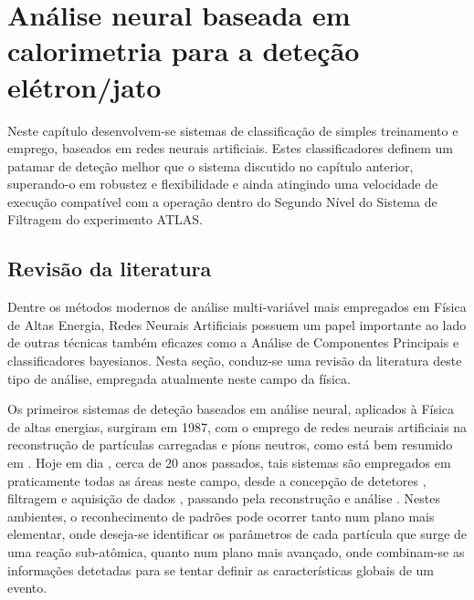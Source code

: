 \typeout{ ====================================================================}
\typeout{ ====================================================================}

\chapter{Análise neural baseada em calorimetria para a deteção
elétron/jato} 
\label{chap:neural}

Neste capítulo desenvolvem-se sistemas de classificação de simples treinamento
e emprego, baseados em redes neurais artificiais. Estes classificadores definem
um patamar de deteção melhor que o sistema discutido no capítulo anterior,
superando-o em robustez e flexibilidade e ainda atingindo uma velocidade de
execução compatível com a operação dentro do Segundo Nível do Sistema de
Filtragem do experimento ATLAS.

\section{Revisão da literatura}
\label{sec:review}

Dentre os métodos modernos de análise multi-variável mais empregados em Física
de Altas Energia, Redes Neurais Artificiais possuem um papel importante ao
lado de outras técnicas também eficazes como a Análise de Componentes
Principais e classificadores bayesianos. Nesta seção, conduz-se uma revisão da
literatura deste tipo de análise, empregada atualmente neste campo da física.

Os primeiros sistemas de deteção baseados em análise neural, aplicados à
Física de altas energias, surgiram em 1987, com o emprego de redes neurais
artificiais na reconstrução de partículas carregadas e píons neutros, como
está bem resumido em \cite{denby-nim-1997}. Hoje em dia \cite{denby-nim-2004},
cerca de 20 anos passados, tais sistemas são empregados em praticamente todas
as áreas neste campo, desde a concepção de detetores \cite{wilk-nim-2006},
filtragem e aquisição de dados \cite{denby-nim-2003, kohne-nim-1997,
varela-cms-1998}, passando pela reconstrução 
\cite{peterson-nim-1988} e análise
\cite{kiesling-nim-2004, bhat-aip-1995}. Nestes ambientes, o reconhecimento de
padrões pode ocorrer tanto num plano mais elementar, onde deseja-se
identificar os parâmetros de cada partícula que surge de uma reação
sub-atômica, quanto num plano mais avançado, onde combinam-se as informações
detetadas para se tentar definir as características globais de um evento.

